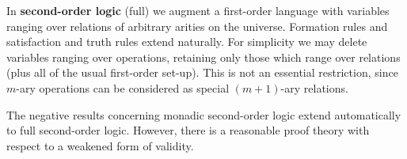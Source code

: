 In \textbf{second-order logic} (full) we augment a first-order language with variables ranging over relations of arbitrary arities on the universe. Formation rules and satisfaction and truth rules extend naturally. For simplicity we may delete variables ranging over operations, retaining only those which range over relations (plus all of the usual first-order set-up). This is not an essential restriction, since $m$-ary operations can be considered as special $(m+1)$-ary relations.

The negative results concerning monadic second-order logic extend automatically to full second-order logic. However, there is a reasonable proof theory with respect to a weakened form of validity.

